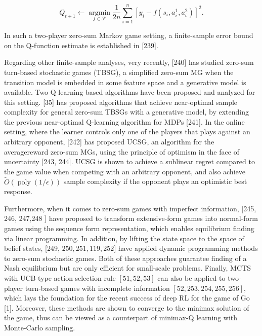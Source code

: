 \documentclass[10pt]{article}
\begin{document}
\[
Q_{t+1} \leftarrow \underset{f \in \mathcal{F}}{\operatorname{argmin}} \frac{1}{2 n} \sum_{i=1}^{n}\left[y_{i}-f\left(s_{i}, a_{i}^{1}, a_{i}^{2}\right)\right]^{2} .
\]

In such a two-player zero-sum Markov game setting, a finite-sample error bound on the Q-function estimate is established in [239].

Regarding other finite-sample analyses, very recently, [240] has studied zero-sum turn-based stochastic games (TBSG), a simplified zero-sum MG when the transition model is embedded in some feature space and a generative model is available. Two Q-learning based algorithms have been proposed and analyzed for this setting. [35] has proposed algorithms that achieve near-optimal sample complexity for general zero-sum TBSGs with a generative model, by extending the previous near-optimal Q-learning algorithm for MDPs [241]. In the online setting, where the learner controls only one of the players that plays against an arbitrary opponent, [242] has proposed UCSG, an algorithm for the averagereward zero-sum MGs, using the principle of optimism in the face of uncertainty [243, 244]. UCSG is shown to achieve a sublinear regret compared to the game value when competing with an arbitrary opponent, and also achieve $\widetilde{O}(\operatorname{poly}(1 / \epsilon))$ sample complexity if the opponent plays an optimistic best response.

Furthermore, when it comes to zero-sum games with imperfect information, [245, 246, 247,248 ] have proposed to transform extensive-form games into normal-form games using the sequence form representation, which enables equilibrium finding via linear programming. In addition, by lifting the state space to the space of belief states, [249, $250,251,119,252]$ have applied dynamic programming methods to zero-sum stochastic games. Both of these approaches guarantee finding of a Nash equilibrium but are only efficient for small-scale problems. Finally, MCTS with UCB-type action selection rule $[51,52,53]$ can also be applied to two-player turn-based games with incomplete information $[52,253,254,255,256]$, which lays the foundation for the recent success of deep RL for the game of Go [1]. Moreover, these methods are shown to converge to the minimax solution of the game, thus can be viewed as a counterpart of minimax-Q learning with Monte-Carlo sampling.
\end{document}
